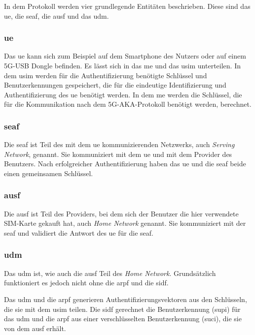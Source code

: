 In dem Protokoll werden vier grundlegende Entitäten beschrieben.
Diese sind das \gls{ue}, die \gls{seaf}, die \gls{ausf} und das \gls{udm}.

\subsubsection{\gls{ue}}

Das \gls{ue} kann sich zum Beispiel auf dem Smartphone des Nutzers oder auf einem 5G-USB Dongle befinden.
Es lässt sich in das \gls{me} und das \gls{usim} unterteilen.
In dem \gls{usim} werden für die Authentifizierung benötigte Schlüssel und Benutzerkennungen gespeichert, die für die eindeutige Identifizierung und Authentifizierung des \gls{ue} benötigt werden. %
In dem \gls{me} werden die Schlüssel, die für die Kommunikation nach dem 5G-AKA-Protokoll benötigt werden, berechnet.

\subsubsection{\gls{seaf}}

Die \gls{seaf} ist Teil des mit dem \gls{ue} kommunizierenden Netzwerks, auch \textit{Serving Network}, genannt.
Sie kommuniziert mit dem \gls{ue} und mit dem Provider des Benutzers.
Nach erfolgreicher Authentifizierung haben das \gls{ue} und die \gls{seaf} beide einen gemeinsamen Schlüssel.%

\subsubsection{\gls{ausf}}

Die \gls{ausf} ist Teil des Providers, bei dem sich der Benutzer die hier verwendete SIM-Karte gekauft hat, auch \textit{Home Network} genannt.
Sie kommuniziert mit der \gls{seaf} und validiert die Antwort des \gls{ue} für die \gls{seaf}.

\subsubsection{\gls{udm}}

Das \gls{udm} ist, wie auch die \gls{ausf} Teil des \textit{Home Network}.
Grundsätzlich funktioniert es jedoch nicht ohne die \gls{arpf} und die \gls{sidf}.

Das \gls{udm} und die \gls{arpf} generieren Authentifizierungsvektoren aus den Schlüsseln, die sie mit dem \gls{usim} teilen.
Die \gls{sidf} gerechnet die Benutzerkennung (\gls{supi}) für das \gls{udm} und die \gls{arpf} aus einer verschlüsselten Benutzerkennung (\gls{suci}), die sie von dem \gls{ausf} erhält.


